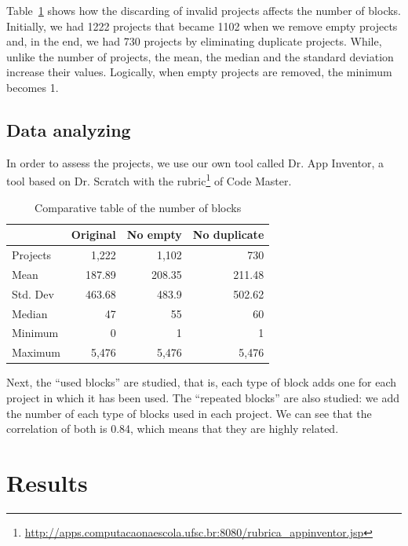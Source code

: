 \documentclass[a4paper]{article}
\begin{document}
Table~\ref{tab:blocks} shows how the discarding of invalid projects affects the number of blocks. Initially, we had 1222 projects that became 1102 when we remove empty projects and, in the end, we had 730 projects by eliminating duplicate projects. While, unlike the number of projects, the mean, the median and the standard deviation increase their values. Logically, when empty projects are removed, the minimum becomes 1.

\subsection{Data analyzing}
In order to assess the projects, we use our own tool called Dr. App Inventor, a tool based on Dr. Scratch with the 
rubric\footnote{\url{http://apps.computacaonaescola.ufsc.br:8080/rubrica_appinventor.jsp}} of Code Master.

\begin{table}
\begin{center}
\caption{Comparative table of the number of blocks}
\bigskip
\label{tab:blocks}
\begin{tabular}{|l|r|r|r|}
\hline
& Original & No empty & No duplicate \\ \hline
Projects & 1,222 & 1,102 & 730\\ \hline
Mean & 187.89 & 208.35 & 211.48\\ \hline
Std. Dev & 463.68 & 483.9 & 502.62 \\ \hline
Median & 47 & 55 & 60\\ \hline
Minimum & 0 & 1 & 1\\ \hline
Maximum & 5,476 & 5,476 & 5,476 \\ \hline
\end{tabular}
\end{center}
\end{table}

Next, the ``used blocks'' are studied, that is, each type of block adds one for each project in which it has been used. The ``repeated blocks'' are also studied: we add the number of each type of blocks used in each project. We can see that the correlation of both is 0.84, which means that they are highly related.

\section{Results}
\end{document}
